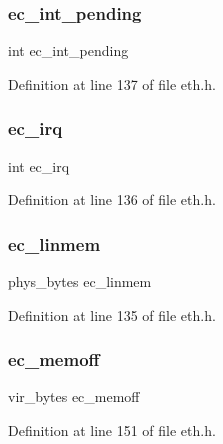 \subsubsection{\texorpdfstring{ec\+\_\+int\+\_\+pending}{ec\_int\_pending}}
{\footnotesize\ttfamily int ec\+\_\+int\+\_\+pending}



Definition at line 137 of file eth.\+h.

\hypertarget{structeth__card_a0e86266e3a1ed0a4cabaf2bbe8e6fb10}{}\label{structeth__card_a0e86266e3a1ed0a4cabaf2bbe8e6fb10} 
\subsubsection{\texorpdfstring{ec\+\_\+irq}{ec\_irq}}
{\footnotesize\ttfamily int ec\+\_\+irq}



Definition at line 136 of file eth.\+h.

\hypertarget{structeth__card_af9f342fc73490342cbb6c3b75c316817}{}\label{structeth__card_af9f342fc73490342cbb6c3b75c316817} 
\subsubsection{\texorpdfstring{ec\+\_\+linmem}{ec\_linmem}}
{\footnotesize\ttfamily phys\+\_\+bytes ec\+\_\+linmem}



Definition at line 135 of file eth.\+h.

\hypertarget{structeth__card_a7f0dbfd00ec4c177be3074c802e61244}{}\label{structeth__card_a7f0dbfd00ec4c177be3074c802e61244} 
\subsubsection{\texorpdfstring{ec\+\_\+memoff}{ec\_memoff}}
{\footnotesize\ttfamily vir\+\_\+bytes ec\+\_\+memoff}



Definition at line 151 of file eth.\+h.

\hypertarget{structeth__card_a818ef13572152bb76eb0465686d83843}{}\label{structeth__card_a818ef13572152bb76eb0465686d83843} 
